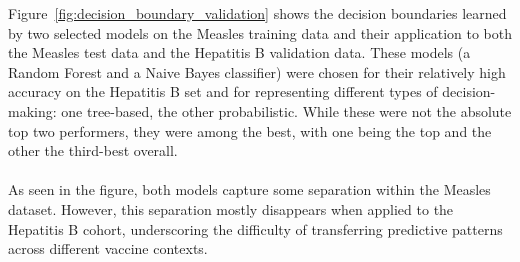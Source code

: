 \documentclass[12pt,a4paper]{report}
\begin{document}
\noindent
Figure~\ref{fig:decision_boundary_validation} shows the decision boundaries learned by two selected models on the Measles training data and their application to both the Measles test data and the Hepatitis B validation data. These models (a Random Forest and a Naive Bayes classifier) were chosen for their relatively high accuracy on the Hepatitis B set and for representing different types of decision-making: one tree-based, the other probabilistic. While these were not the absolute top two performers, they were among the best, with one being the top and the other the third-best overall.\\
\\
As seen in the figure, both models capture some separation within the Measles dataset. However, this separation mostly disappears when applied to the Hepatitis B cohort, underscoring the difficulty of transferring predictive patterns across different vaccine contexts.\\
\end{document}
